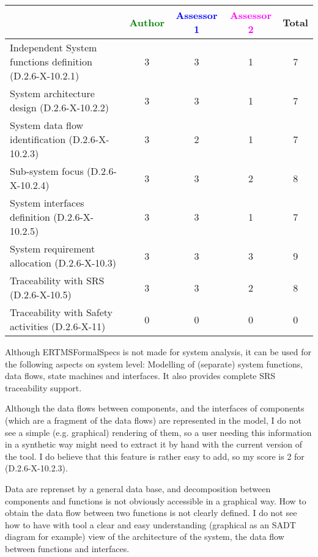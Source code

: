 \begin{tabular}{|l | c | c | c | c|}
\hline
& \textcolor{green}{Author} & \textcolor{blue}{Assessor 1} & \textcolor{magenta}{Assessor 2} & Total \\
\hline
Independent System functions definition (D.2.6-X-10.2.1)  & 3 & 3 & 1 & 7  \\
\hline 
System architecture design (D.2.6-X-10.2.2) & 3 & 3 & 1 & 7 \\
\hline
System data flow identification (D.2.6-X-10.2.3)  & 3 & 2 & 1 & 7 \\
\hline
Sub-system focus (D.2.6-X-10.2.4)  & 3 & 3 & 2 & 8 \\
\hline
System interfaces definition (D.2.6-X-10.2.5)  & 3 & 3 & 1 & 7 \\
\hline
System requirement allocation (D.2.6-X-10.3)  & 3 & 3 & 3 & 9 \\
\hline
Traceability with SRS (D.2.6-X-10.5)  & 3 & 3 & 2 & 8 \\
\hline
Traceability with Safety activities (D.2.6-X-11)  & 0 & 0 & 0 & 0 \\
\hline
\end{tabular}

\begin{author_comment}
Although ERTMSFormalSpecs is not made for system analysis, it can be used for the following aspects on system level: Modelling of (separate) system functions, data flows, state machines and interfaces. It also provides complete SRS traceability support.  
\end{author_comment}

\begin{assessor1}
Although the data flows between components, and the interfaces of components (which are a fragment of the data flows) are represented in the model, I do not see a simple (e.g. graphical) rendering of them, so a user needing this information in a synthetic way might need to extract it by hand with the current version of the tool. I do believe that this feature is rather easy to add, so my score is 2 for (D.2.6-X-10.2.3). 
\end{assessor1}


\begin{assessor2}
Data are reprenset by a general data base, and decomposition between components and functions is not obviously  accessible in a graphical way. How to obtain the data flow between two  functions is not clearly defined.
I do not see how to have with tool a clear and easy understanding (graphical as an SADT diagram for example) view of the architecture of the system, the data flow between functions and interfaces.
\end{assessor2}


